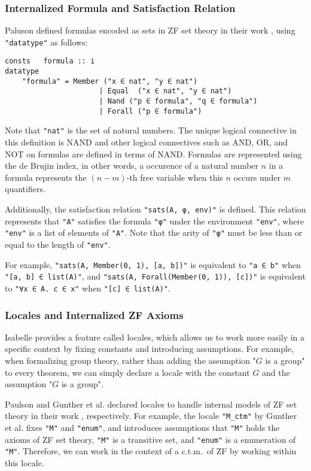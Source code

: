 \documentclass{report}
\newenvironment{isaframe}{\begin{mdframed}[topline=false, rightline=false, bottomline=false]}{\end{mdframed}}
\begin{document}
\subsubsection{Internalized Formula and Satisfaction Relation}
Paluson defined formulas encoded as sets in ZF set theory in their work \cite{paulson_AC_consistency},
using \texttt{"datatype"} as follows:
\begin{isaframe}
\begin{verbatim}
consts   formula :: i
datatype
    "formula" = Member ("x ∈ nat", "y ∈ nat")
                      | Equal  ("x ∈ nat", "y ∈ nat")
                      | Nand ("p ∈ formula", "q ∈ formula")
                      | Forall ("p ∈ formula")
\end{verbatim}
\end{isaframe}
Note that \texttt{"nat"} is the set of natural numbers.
The unique logical connective in this definition is NAND and 
other logical connectives such as AND, OR, and NOT on formulas are defined in terms of NAND.
Formulas are represented using the de Brujin index, in other words, 
a occurence of a natural number $n$ in a formula represents the $(n - m)$-th free variable when this $n$ occurs under $m$ quantifiers.

Additionally, the satisfaction relation \texttt{"sats(A, φ, env)"} is defined.
This relation represents that \texttt{"A"} satisfies the formula \texttt{"φ"} 
under the environment \texttt{"env"}, where \texttt{"env"} is a list of elements of \texttt{"A"}.
Note that the arity of \texttt{"φ"} must be less than or equal to the length of \texttt{"env"}.

For example, \texttt{"sats(A, Member(0, 1), [a, b])"} is equivalent to \texttt{"a ∈ b"} when \texttt{"[a, b] ∈ list(A)"}, 
and \texttt{"sats(A, Forall(Member(0, 1)), [c])"} is equivalent to \texttt{"∀x ∈ A. c ∈ x"} when \texttt{"[c] ∈ list(A)"}.


\subsubsection{Locales and Internalized ZF Axioms}
Isabelle provides a feature called locales, 
which allows us to work more easily in a specific context by fixing constants and introducing assumptions.
For example, when formalizing group theory, rather than adding the assumption "$G$ is a group" to every theorem,
we can simply declare a locale with the constant $G$ and the assumption "$G$ is a group".
 
Paulson and Gunther et al. declared locales to handle internal models of ZF set theory in their work \cite{paulson_AC_consistency, gunther_forcing}, respectively.
For example, the locale \texttt{"M\_ctm"} by Gunther et al. fixes \texttt{"M"} and \texttt{"enum"},
and introduces assumptions that \texttt{"M"} holds the axioms of ZF set theory, 
\texttt{"M"} is a transitive set, and \texttt{"enum"} is a enumeration of \texttt{"M"}.
Therefore, we can work in the context of a c.t.m.\  of ZF by working within this locale.
\end{document}
